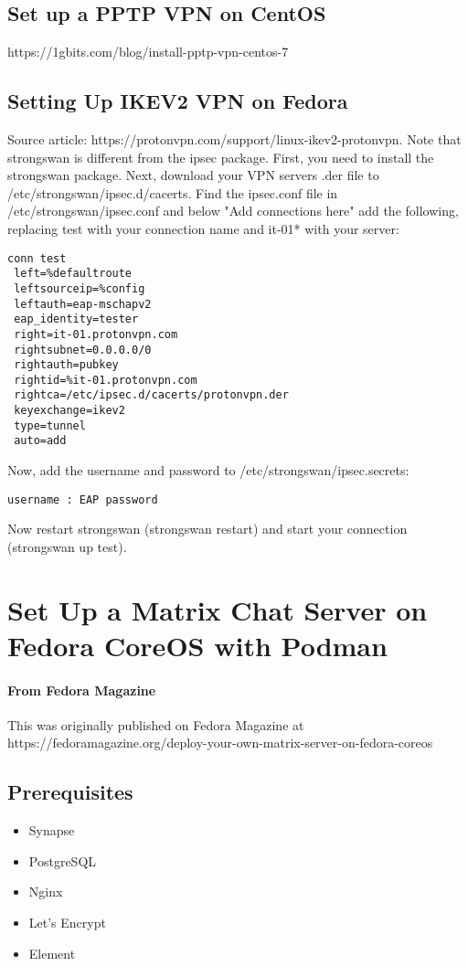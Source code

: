 \documentclass{article}
\begin{document}
\subsection{Set up a PPTP VPN on CentOS}
https://1gbits.com/blog/install-pptp-vpn-centos-7

\subsection{Setting Up IKEV2 VPN on Fedora}
Source article: https://protonvpn.com/support/linux-ikev2-protonvpn.
Note that strongswan is different from the ipsec package.
First, you need to install the strongswan package. Next, download your VPN servers .der file to /etc/strongswan/ipsec.d/cacerts. Find the ipsec.conf file in /etc/strongswan/ipsec.conf and below "Add connections here" add the following, replacing test with your connection name and it-01* with your server:
\begin{verbatim}
conn test
 left=%defaultroute
 leftsourceip=%config
 leftauth=eap-mschapv2
 eap_identity=tester
 right=it-01.protonvpn.com
 rightsubnet=0.0.0.0/0
 rightauth=pubkey
 rightid=%it-01.protonvpn.com
 rightca=/etc/ipsec.d/cacerts/protonvpn.der
 keyexchange=ikev2
 type=tunnel
 auto=add
\end{verbatim}

Now, add the username and password to /etc/strongswan/ipsec.secrets:
\begin{verbatim}
username : EAP password
\end{verbatim}

Now restart strongswan (strongswan restart) and start your connection (strongswan up test).


\section{Set Up a Matrix Chat Server on Fedora CoreOS with Podman}
\paragraph{From Fedora Magazine}   
This was originally published on Fedora Magazine at https://fedoramagazine.org/deploy-your-own-matrix-server-on-fedora-coreos

\subsection{Prerequisites}
\begin{itemize}
	\item Synapse
	\item PostgreSQL
	\item Nginx
	\item Let's Encrypt
	\item Element
\end{itemize}
\end{document}
